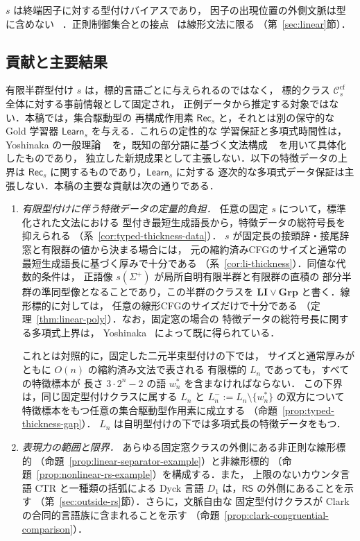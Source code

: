 \documentclass[11pt,a4paper]{ltjsarticle}
\theoremstyle{remark}
\theoremstyle{plain}
\newcommand{\cf}{\mathrm{cf}}
\newcommand{\Ccf}[1]{\mathcal C_{#1}^{\cf}}
\begin{document}
$s$ は終端因子に対する型付けバイアスであり，
因子の出現位置の外側文脈は型に含めない
~\cite{coste-typing2004}．正則制御集合との接点~\cite{takada1988,takada1995} は線形文法に限る
（第~\ref{sec:linear}節）．

\subsection{貢献と主要結果}

有限半群型付け $s$ は，標的言語ごとに与えられるのではなく，
標的クラス $\Ccf{s}$ 全体に対する事前情報として固定され，
正例データから推定する対象ではない．本稿では，集合駆動型の
再構成作用素 $\mathsf{Rec}_s$ と，それとは別の保守的な
Gold 学習器 $\mathsf{Learn}_s$ を与える．これらの定性的な
学習保証と多項式時間性は，Yoshinaka の一般理論
~\cite{yoshinaka2015} を，既知の部分語に基づく文法構成
~\cite{yoshinaka2008} を用いて具体化したものであり，
独立した新規成果として主張しない．以下の特徴データの上界は
$\mathsf{Rec}_s$ に関するものであり，$\mathsf{Learn}_s$ に対する
逐次的な多項式データ保証は主張しない．本稿の主要な貢献は次の通りである．

\begin{enumerate}[label=\textup{(\arabic*)},leftmargin=2.4em]

\item \emph{有限型付けに伴う特徴データの定量的負担．}
任意の固定 $s$ について，標準化された文法における
型付き最短生成語長から，特徴データの総符号長を抑えられる
（系~\ref{cor:typed-thickness-data}）．
$s$ が固定長の接頭辞・接尾辞窓と有限群の値から決まる場合には，
元の縮約済みCFGのサイズと通常の最短生成語長に基づく厚みで十分である
（系~\ref{cor:li-thickness}）．同値な代数的条件は，
正語像 $s(\Sigma^+)$ が局所自明有限半群と有限群の直積の
部分半群の準同型像となることであり，この半群のクラスを
$\mathbf{LI}\vee\mathbf{Grp}$ と書く．線形標的に対しては，
任意の線形CFGのサイズだけで十分である
（定理~\ref{thm:linear-poly}）．なお，固定窓の場合の
特徴データの総符号長に関する多項式上界は，
Yoshinaka~\cite[Theorem~1]{yoshinaka2008} によって既に得られている．

これとは対照的に，固定した二元半束型付けの下では，
サイズと通常厚みがともに $O(n)$ の縮約済み文法で表される
有限標的 $L_n$ であっても，すべての特徴標本が
長さ $3\cdot2^n-2$ の語 $w_n^*$ を含まなければならない．
この下界は，同じ固定型付けクラスに属する
$L_n$ と $L_n^-:=L_n\setminus\{w_n^*\}$ の双方について
特徴標本をもつ任意の集合駆動型作用素に成立する
（命題~\ref{prop:typed-thickness-gap}）．
$L_n$ は自明型付けの下では多項式長の特徴データをもつ．

\item \emph{表現力の範囲と限界．}
あらゆる固定窓クラスの外側にある非正則な線形標的
（命題~\ref{prop:linear-separator-example}）と非線形標的
（命題~\ref{prop:nonlinear-rs-example}）を構成する．また，
上限のないカウンタ言語 $\mathrm{CTR}$ と一種類の括弧による
Dyck 言語 $D_1$ は，$\mathsf{RS}$ の外側にあることを示す
（第~\ref{sec:outside-rs}節）．さらに，文脈自由な
固定型付けクラスが Clark の合同的言語族に含まれることを示す
（命題~\ref{prop:clark-congruential-comparison}）．

\end{enumerate}
\end{document}
